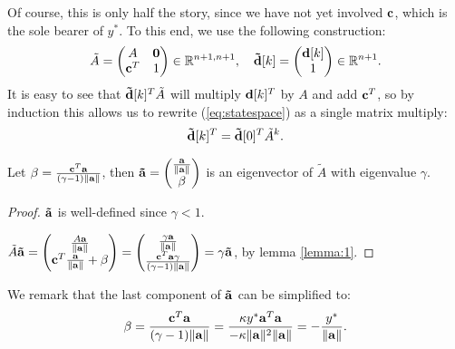 Of course, this is only half the story, since we have not yet involved $\mathbf{c}$, which is the sole bearer of $y^*$. To this end, we use the following construction:
\begin{equation*}
\tilde{A} = \begin{pmatrix}
A & \mathbf{0} \\
\mathbf{c}^T & 1
\end{pmatrix} \in \mathbb{R}^{n+1,n+1}, \quad \mathbf{\tilde{d}}[k] = \begin{pmatrix}\mathbf{d}[k] \\ 1\end{pmatrix} \in \mathbb{R}^{n+1}.
\end{equation*}
It is easy to see that $\mathbf{\tilde{d}}[k]^T \tilde{A}$ will multiply $\mathbf{d}[k]^T$ by $A$ and add $\mathbf{c}^T$, so by induction this allows us to rewrite (\ref{eq:statespace}) as a single matrix multiply:
\begin{equation}
\label{eq:system}
\mathbf{\tilde{d}}[k]^T = \mathbf{\tilde{d}}[0]^T \tilde{A}^k .
\end{equation}


\begin{lemma}\label{lemma:3} Let $\beta = \frac{\mathbf{c}^T \mathbf{a}}{(\gamma - 1)\|\mathbf{a}\|}$, then $\mathbf{\tilde{a}} = \begin{pmatrix}\frac{\mathbf{a}}{\|\mathbf{a}\|} \\ \beta \end{pmatrix}$ is an eigenvector of $\tilde{A}$ with eigenvalue $\gamma$.\end{lemma}

\begin{proof}$\mathbf{\tilde{a}}$ is well-defined since $\gamma < 1$.
 
$\tilde{A}\mathbf{\tilde{a}} = \begin{pmatrix}\frac{A\mathbf{a}}{\|\mathbf{a}\|} \\ \mathbf{c}^T\frac{\mathbf{a}}{\|\mathbf{a}\|} + \beta\end{pmatrix} = \begin{pmatrix}\frac{\gamma \mathbf{a}}{\|\mathbf{a}\|} \\ \frac{\mathbf{c}^T \mathbf{a} \gamma}{(\gamma - 1)\|\mathbf{a}\|}\end{pmatrix} = \gamma \mathbf{\tilde{a}}$, by lemma \ref{lemma:1}.\end{proof}

We remark that the last component of $\mathbf{\tilde{a}}$ can be simplified to: $$\beta = \frac{\mathbf{c}^T \mathbf{a}}{(\gamma - 1)\|\mathbf{a}\|} = \frac{\kappa y^* \mathbf{a}^T \mathbf{a}}{- \kappa \|\mathbf{a}\|^2 \|\mathbf{a}\|} = -\frac{y^*}{\|\mathbf{a}\|}.$$

